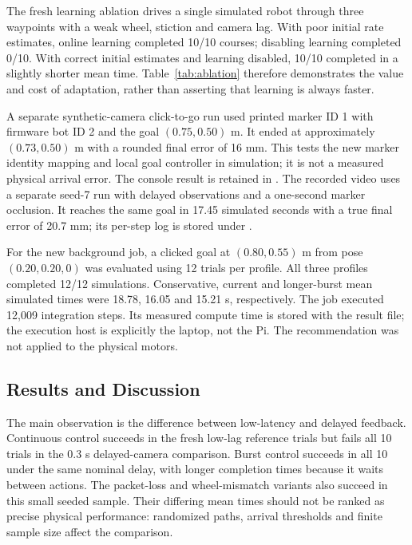 \documentclass[11pt,a4paper]{article}
\newcommand{\code}[1]{\texttt{\detokenize{#1}}}
\begin{document}


The fresh learning ablation drives a single simulated robot through three
waypoints with a weak wheel, stiction and camera lag. With poor initial rate
estimates, online learning completed 10/10 courses; disabling learning completed
0/10. With correct initial estimates and learning disabled, 10/10 completed in a
slightly shorter mean time. Table~\ref{tab:ablation} therefore demonstrates the
value and cost of adaptation, rather than asserting that learning is always faster.



A separate synthetic-camera click-to-go run used printed marker ID 1 with firmware bot ID 2 and the goal $(0.75,0.50)$ m. It ended at approximately $(0.73,0.50)$ m with a rounded final error of 16 mm. This tests the new marker identity mapping and local goal controller in simulation; it is not a measured physical arrival error. The console result is retained in \code{evidence/marker_click_demo.txt}.
The recorded video uses a separate seed-7 run with delayed observations and a
one-second marker occlusion. It reaches the same goal in 17.45 simulated seconds
with a true final error of 20.7 mm; its per-step log is stored under \code{media/}.

For the new background job, a clicked goal at $(0.80,0.55)$ m from pose
$(0.20,0.20,0)$ was evaluated using 12 trials per profile. All three profiles
completed 12/12 simulations. Conservative, current and longer-burst mean simulated
times were 18.78, 16.05 and 15.21 s, respectively. The job executed 12,009 integration
steps. Its measured compute time is stored with the result file; the execution
host is explicitly the laptop, not the Pi. The recommendation was not applied to
the physical motors.

\subsection{Results and Discussion}
The main observation is the difference between low-latency and delayed feedback.
Continuous control succeeds in the fresh low-lag reference trials but fails all
10 trials in the 0.3 s delayed-camera comparison. Burst control succeeds in all
10 under the same nominal delay, with longer completion times because it waits
between actions. The packet-loss and wheel-mismatch variants also succeed in this
small seeded sample. Their differing mean times should not be ranked as precise
physical performance: randomized paths, arrival thresholds and finite sample size
affect the comparison.
\end{document}

